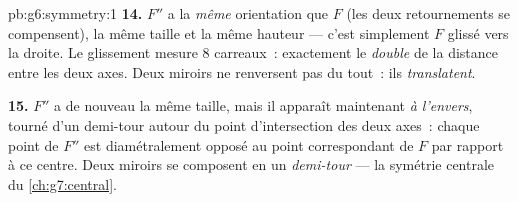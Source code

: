 \begin{solution}{pb:g6:symmetry:1}
\textbf{14.} $F''$ a la \emph{même} orientation que $F$ (les deux
retournements se compensent), la même taille et la même hauteur ---
c'est simplement $F$ glissé vers la droite. Le glissement mesure $8$
carreaux~: exactement le \emph{double} de la distance entre les deux
axes. Deux miroirs  ne renversent pas du tout~: ils
\emph{translatent}.

\textbf{15.} $F''$ a de nouveau la même taille, mais il apparaît
maintenant \emph{à l'envers}, tourné d'un demi-tour autour du point
d'intersection des deux axes~: chaque point de $F''$ est
diamétralement opposé au point correspondant de $F$ par rapport à ce
centre. Deux miroirs  se composent en un
\emph{demi-tour} --- la symétrie centrale du \cref{ch:g7:central}.
\end{solution}
